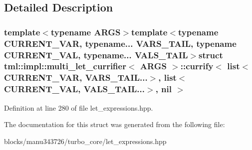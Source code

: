 \subsection{Detailed Description}
\subsubsection*{template$<$typename A\+R\+G\+S$>$template$<$typename C\+U\+R\+R\+E\+N\+T\+\_\+\+V\+A\+R, typename... V\+A\+R\+S\+\_\+\+T\+A\+I\+L, typename C\+U\+R\+R\+E\+N\+T\+\_\+\+V\+A\+L, typename... V\+A\+L\+S\+\_\+\+T\+A\+I\+L$>$struct tml\+::impl\+::multi\+\_\+let\+\_\+currifier$<$ A\+R\+G\+S $>$\+::currify$<$ list$<$ C\+U\+R\+R\+E\+N\+T\+\_\+\+V\+A\+R, V\+A\+R\+S\+\_\+\+T\+A\+I\+L...$>$, list$<$ C\+U\+R\+R\+E\+N\+T\+\_\+\+V\+A\+L, V\+A\+L\+S\+\_\+\+T\+A\+I\+L...$>$, nil $>$}



Definition at line 280 of file let\+\_\+expressions.\+hpp.



The documentation for this struct was generated from the following file\+:\begin{DoxyCompactItemize}
\item 
blocks/manu343726/turbo\+\_\+core/let\+\_\+expressions.\+hpp\end{DoxyCompactItemize}
